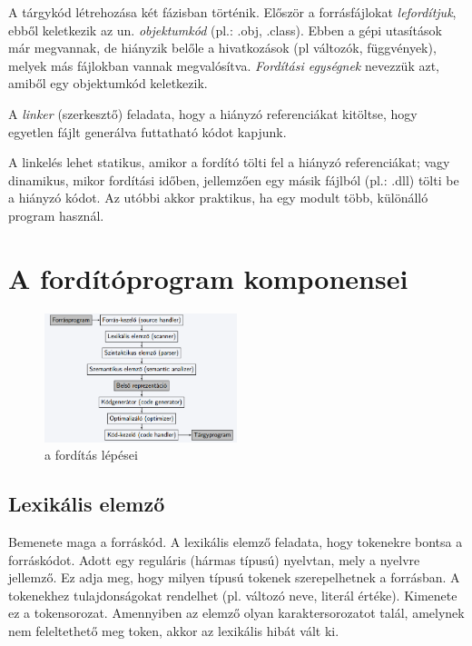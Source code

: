 \documentclass[margin=0px]{article}
\begin{document}
A tárgykód létrehozása két fázisban történik. Először a forrásfájlokat \textit{lefordítjuk}, ebből keletkezik az un. \textit{objektumkód} (pl.: .obj, .class). Ebben a gépi utasítások már megvannak, de hiányzik belőle a hivatkozások (pl változók, függvények), melyek más fájlokban vannak megvalósítva. \textit{Fordítási egységnek} nevezzük azt, amiből egy objektumkód keletkezik.

A \textit{linker} (szerkesztő) feladata, hogy a hiányzó referenciákat kitöltse, hogy egyetlen fájlt generálva futtatható kódot kapjunk.

A linkelés lehet statikus, amikor a fordító tölti fel a hiányzó referenciákat; vagy dinamikus, mikor fordítási időben, jellemzően egy másik fájlból (pl.: .dll) tölti be a hiányzó kódot. Az utóbbi akkor praktikus, ha egy modult több, különálló program használ.


\section{A fordítóprogram komponensei}
\begin{figure}[H]
    \centering
    \includegraphics[width=0.5\textwidth]{img/forditas_teljes_folyamata.png}
    \caption{a fordítás lépései}
    \label{fig:forditas_teljes_folyamatabra}
\end{figure}


\subsection{Lexikális elemző}

Bemenete maga a forráskód. A lexikális elemző feladata, hogy tokenekre bontsa a forráskódot. Adott egy reguláris (hármas típusú) nyelvtan, mely a nyelvre jellemző. Ez adja meg,  hogy milyen típusú tokenek szerepelhetnek a forrásban. A tokenekhez tulajdonságokat rendelhet (pl. változó neve, literál értéke). Kimenete ez a tokensorozat. Amennyiben az elemző olyan karaktersorozatot talál, amelynek nem feleltethető meg token, akkor az lexikális hibát vált ki.
\end{document}
